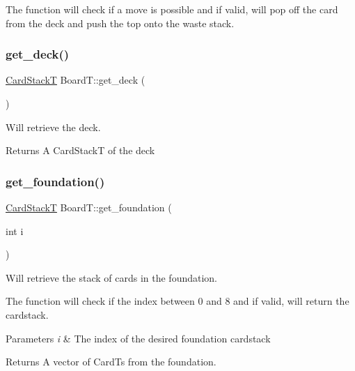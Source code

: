 The function will check if a move is possible and if valid, will pop off the card from the deck and push the top onto the waste stack. \mbox{\label{class_board_t_a2f28e0a5e9c34f396e2aebc79342a225}} 
\subsubsection{\texorpdfstring{get\+\_\+deck()}{get\_deck()}}
{\footnotesize\ttfamily \hyperlink{class_stack}{Card\+StackT} Board\+T\+::get\+\_\+deck (\begin{DoxyParamCaption}{ }\end{DoxyParamCaption})}



Will retrieve the deck. 

\begin{DoxyReturn}{Returns}
A Card\+StackT of the deck 
\end{DoxyReturn}
\mbox{\label{class_board_t_ac61569f97fe32c08aeecc0583170282c}} 
\subsubsection{\texorpdfstring{get\+\_\+foundation()}{get\_foundation()}}
{\footnotesize\ttfamily \hyperlink{class_stack}{Card\+StackT} Board\+T\+::get\+\_\+foundation (\begin{DoxyParamCaption}\item[{int}]{i }\end{DoxyParamCaption})}



Will retrieve the stack of cards in the foundation. 

The function will check if the index between 0 and 8 and if valid, will return the cardstack. 
\begin{DoxyParams}{Parameters}
{\em i} & The index of the desired foundation cardstack \\
\hline
\end{DoxyParams}
\begin{DoxyReturn}{Returns}
A vector of Card\+Ts from the foundation. 
\end{DoxyReturn}
\mbox{\label{class_board_t_af7157e485cd48aa4c3f52d391af1fef3}} 
